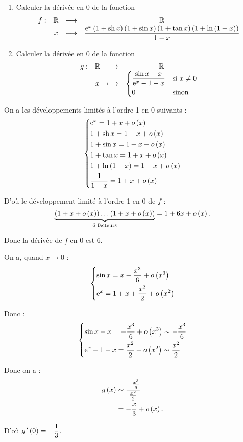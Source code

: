 \begin{exoex}
\begin{enumerate}
    \item Calculer la dérivée en \(0\) de la fonction \[\begin{array}[t]{cccc}f : & \mathbb{R} & \longrightarrow & \mathbb{R} \\ & x & \longmapsto & \dfrac{\mathrm{e}^{x}\left(1+\operatorname{sh} x\right)\left(1+\sin x\right)\left(1+\tan x\right)\left(1+\ln\left(1+x\right)\right)}{1-x}\end{array}\]
    \item Calculer la dérivée en \(0\) de la fonction \[\begin{array}[t]{cccc}g : & \mathbb{R} & \longrightarrow & \mathbb{R} \\ & x & \longmapsto & \begin{dcases}
        \dfrac{\sin x-x}{\mathrm{e}^{x}-1-x} &\text{si }x\not=0 \\
        0 &\text{sinon}
    \end{dcases}\end{array}\]
\end{enumerate}
\end{exoex}

\begin{corr}[1]
On a les développements limités à l'ordre 1 en \(0\) suivants : \[\begin{dcases}
\mathrm{e}^{x}=1+x+o\left(x\right) \\
1+\operatorname{sh} x=1+x+o\left(x\right) \\
1+\sin x=1+x+o\left(x\right) \\
1+\tan x=1+x+o\left(x\right) \\
1+\ln\left(1+x\right)=1+x+o\left(x\right) \\
\dfrac{1}{1-x}=1+x+o\left(x\right)
\end{dcases}\]

D'où le développement limité à l'ordre 1 en \(0\) de \(f\) : \[\underbrace{\left(1+x+o\left(x\right)\right)\dots\left(1+x+o\left(x\right)\right)}_{\text{6 facteurs}}=1+6x+o\left(x\right).\]

Donc la dérivée de \(f\) en \(0\) est \(6\).
\end{corr}

\begin{corr}[2]
On a, quand \(x\to0\) : \[\begin{dcases}
\sin x=x-\dfrac{x^3}{6}+o\left(x^3\right) \\
\mathrm{e}^{x}=1+x+\dfrac{x^2}{2}+o\left(x^2\right)
\end{dcases}\]

Donc : \[\begin{dcases}
\sin x-x=-\dfrac{x^3}{6}+o\left(x^3\right)\sim-\dfrac{x^3}{6} \\
\mathrm{e}^{x}-1-x=\dfrac{x^2}{2}+o\left(x^2\right)\sim\dfrac{x^2}{2}
\end{dcases}\]

Donc on a : \[\begin{aligned}
g\left(x\right)&\sim\dfrac{-\frac{x^3}{6}}{\frac{x^2}{2}} \\
&=-\dfrac{x}{3}+o\left(x\right).
\end{aligned}\]

D'où \(g^{\,\prime}\left(0\right)=-\dfrac{1}{3}\).
\end{corr}

